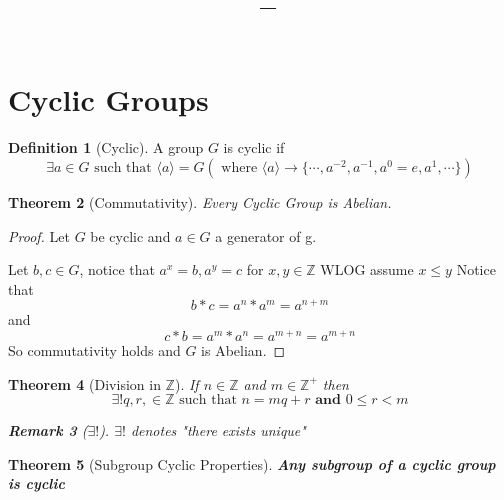 \documentclass[11pt]{article}
\title{\vspace{-1.5em}\textbf{\coursename\ -- \lecturetitle}}
\author{\studentname}
\date{\lecturedate}
\newcommand{\1}{\mathbf{1}}
\theoremstyle{notestyle}
\newtheorem{theorem}{Theorem}[section]
\theoremstyle{definition}
\newtheorem{definition}[theorem]{Definition}
\newtheorem{remark}[theorem]{Remark}
\begin{document}
\maketitle

\section{Cyclic Groups}
\begin{definition}[Cyclic]
\label{def:label}
A group $G$ is cyclic if $$\exists a \in G \text{ such that } \langle a \rangle
=G(\text{ where } \langle a \rangle \rightarrow \{\cdots, a^{-2}, a^{-1}, a^{0} = e, a^{1}, \cdots\})$$
\end{definition}
\begin{theorem}[Commutativity]
\label{thm:label}
Every Cyclic Group is Abelian.
\end{theorem}
\begin{proof}
    Let $G$ be cyclic and $a \in G$ a generator of g.
\par    Let $b, c \in G$, notice that $a^{x} = b, a^{y} = c$ for $x, y \in \mathbb{Z}$ WLOG assume $x \le y$
Notice that $$b * c = a^n * a^m = a^{n + m}$$ and $$c * b = a^{m} * a^{n} = a^{m + n}
=a^{m + n}$$
So commutativity holds and $G$ is Abelian.
\end{proof}
\begin{theorem}[Division in $\mathbb{Z}$]
\label{thm:label}
If $n \in \mathbb{Z}$ and $m \in \mathbb{Z}^{+}$ then $$\exists! q, r, \in \mathbb{Z}
\text{ such that } n = mq + r \textbf{ and } 0 \le r < m $$
\begin{remark}[$\exists !$]
\label{rem:label}
$\exists !$ denotes "there exists unique"
\end{remark}
\end{theorem}
\begin{theorem}[Subgroup Cyclic Properties]
\label{thm:label}
\textbf{Any subgroup of a cyclic group is cyclic}
\end{theorem}
\end{document}
